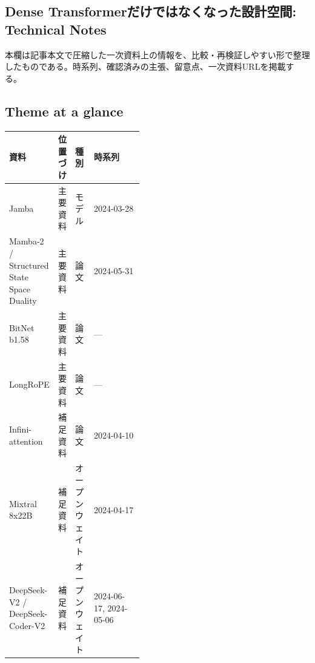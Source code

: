 \subsection*{Dense Transformerだけではなくなった設計空間: Technical Notes}
本欄は記事本文で圧縮した一次資料上の情報を、比較・再検証しやすい形で整理したものである。時系列、確認済みの主張、留意点、一次資料URLを掲載する。
\medskip
\subsection*{Theme at a glance}
\begin{center}
\footnotesize
\begin{tabularx}{\linewidth}{@{}p{0.20\linewidth}p{0.10\linewidth}p{0.14\linewidth}X@{}}
\toprule
資料 & 位置づけ & 種別 & 時系列 \\
\midrule
Jamba & 主要資料 & モデル & 2024-03-28   \\
Mamba-2 / Structured State Space Duality & 主要資料 & 論文 & 2024-05-31   \\
BitNet b1.58 & 主要資料 & 論文 & — \\
LongRoPE & 主要資料 & 論文 & — \\
Infini-attention & 補足資料 & 論文 & 2024-04-10   \\
Mixtral 8x22B & 補足資料 & オープンウェイト & 2024-04-17   \\
DeepSeek-V2 / DeepSeek-Coder-V2 & 補足資料 & オープンウェイト & 2024-06-17, 2024-05-06   \\
\bottomrule
\end{tabularx}
\end{center}
\normalsize

